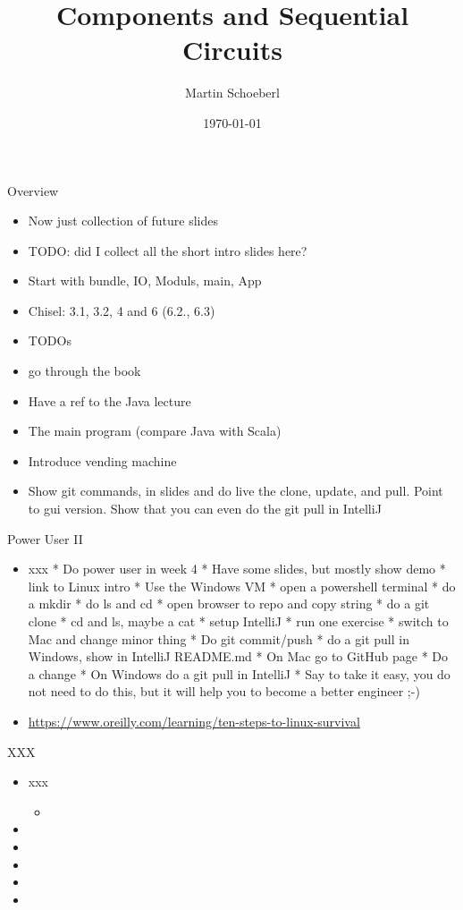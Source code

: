 \documentclass[xcolor=pdflatex,dvipsnames,table]{beamer}
\title{Components and Sequential Circuits}
\author{Martin Schoeberl}
\date{\today}
\institute{Technical University of Denmark\\
Embedded Systems Engineering}
\begin{document}
\begin{frame}
\titlepage
\end{frame}


\begin{frame}[fragile]{Overview}
\begin{itemize}
\item Now just  collection of future slides
\item TODO: did I collect all the short intro slides here?
\item Start with bundle, IO, Moduls, main, App
\item Chisel: 3.1, 3.2, 4 and 6 (6.2., 6.3)
\item TODOs
\item go through the book
\item Have a ref to the Java lecture
\item The main program (compare Java with Scala)
\item Introduce vending machine
\item Show git commands, in slides and do live the clone, update, and pull. Point to gui version. Show that you can even do the git pull in IntelliJ
\end{itemize}
\end{frame}


\begin{frame}[fragile]{Power User II}
\begin{itemize}
\item xxx
 * Do power user in week 4
 * Have some slides, but mostly show demo
 * link to Linux intro
 * Use the Windows VM
 * open a powershell terminal
 * do a mkdir
 * do ls and cd
 * open browser to repo and copy string
 * do a git clone
 * cd and ls, maybe a cat
 * setup IntelliJ
 * run one exercise
 * switch to Mac and change minor thing
 * Do git commit/push
 * do a git pull in Windows, show in IntelliJ README.md
 * On Mac go to GitHub page
 * Do a change
 * On Windows do a git pull in IntelliJ
 * Say to take it easy, you do not need to do this, but it will help you to become a better engineer ;-)
\item \url{https://www.oreilly.com/learning/ten-steps-to-linux-survival}

\end{itemize}
\end{frame}

\begin{frame}[fragile]{XXX}
\begin{itemize}
\item xxx
\begin{itemize}
\item
\end{itemize}
\item
\item
\item
\item
\item
\end{itemize}
\end{frame}
\end{document}
